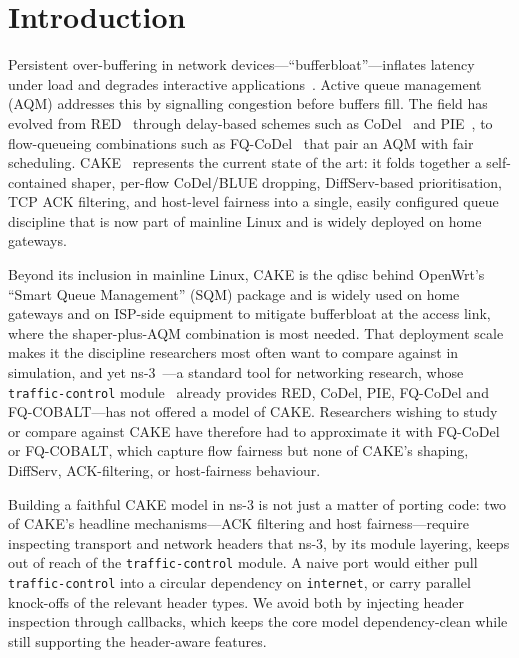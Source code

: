 \documentclass[sigconf,nonacm]{acmart}
\begin{document}

\maketitle

\section{Introduction}
\label{sec:intro}

Persistent over-buffering in network devices---``bufferbloat''---inflates
latency under load and degrades interactive applications~\cite{bufferbloat}.
Active queue management (AQM) addresses this by signalling congestion before
buffers fill. The field has evolved from RED~\cite{red} through delay-based
schemes such as CoDel~\cite{codel} and PIE~\cite{rfc8033}, to flow-queueing
combinations such as FQ-CoDel~\cite{rfc8290} that pair an AQM with fair
scheduling. CAKE~\cite{cake} represents the current state of the art: it folds
together a self-contained shaper, per-flow CoDel/BLUE dropping, DiffServ-based
prioritisation, TCP ACK filtering, and host-level fairness into a single, easily
configured queue discipline that is now part of mainline Linux and is widely
deployed on home gateways.

Beyond its inclusion in mainline Linux, CAKE is the qdisc behind OpenWrt's
``Smart Queue Management'' (SQM) package and is widely used on home gateways and
on ISP-side equipment to mitigate bufferbloat at the access link, where the
shaper-plus-AQM combination is most needed. That deployment scale makes it the
discipline researchers most often want to compare against in simulation, and
yet ns-3~\cite{ns3}---a standard tool for networking research, whose
\texttt{traffic-control} module~\cite{tcmodule} already provides RED, CoDel,
PIE, FQ-CoDel and FQ-COBALT---has not offered a model of CAKE. Researchers
wishing to study or compare against CAKE have therefore had to approximate it
with FQ-CoDel or FQ-COBALT, which capture flow fairness but none of CAKE's
shaping, DiffServ, ACK-filtering, or host-fairness behaviour.

Building a faithful CAKE model in ns-3 is not just a matter of porting code:
two of CAKE's headline mechanisms---ACK filtering and host fairness---require
inspecting transport and network headers that ns-3, by its module layering,
keeps out of reach of the \texttt{traffic-control} module. A naive port would
either pull \texttt{traffic-control} into a circular dependency on
\texttt{internet}, or carry parallel knock-offs of the relevant header types.
We avoid both by injecting header inspection through callbacks, which keeps the
core model dependency-clean while still supporting the header-aware features.
\end{document}
